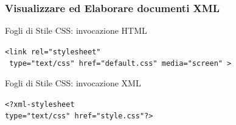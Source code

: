 \documentclass{beamer}
\begin{document}
    \begin{frame}
        \frametitle{Visualizzare ed Elaborare documenti XML}
        \addtocounter{nframe}{1}
        \begin{block}{Fogli di Stile CSS: invocazione HTML}

            \texttt{<link rel="stylesheet" }
                \\\texttt{ type="text/css" href="default.css" media="screen" > }

         \end{block}

         \begin{block}{Fogli di Stile CSS: invocazione XML}
            
            \texttt{<?xml-stylesheet} 
                \\\texttt{type="text/css" href="style.css"?>}

         \end{block}
    
    \end{frame}

        
    
            
        
\end{document}
